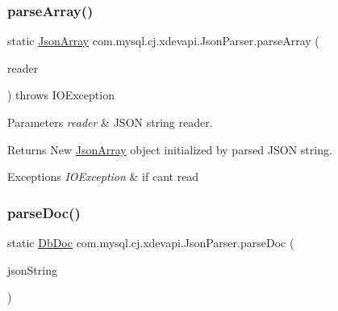 \subsubsection{\texorpdfstring{parse\+Array()}{parseArray()}}
{\footnotesize\ttfamily static \mbox{\hyperlink{classcom_1_1mysql_1_1cj_1_1xdevapi_1_1_json_array}{Json\+Array}} com.\+mysql.\+cj.\+xdevapi.\+Json\+Parser.\+parse\+Array (\begin{DoxyParamCaption}\item[{String\+Reader}]{reader }\end{DoxyParamCaption}) throws I\+O\+Exception\hspace{0.3cm}{\ttfamily [static]}}


\begin{DoxyParams}{Parameters}
{\em reader} & J\+S\+ON string reader. \\
\hline
\end{DoxyParams}
\begin{DoxyReturn}{Returns}
New \mbox{\hyperlink{classcom_1_1mysql_1_1cj_1_1xdevapi_1_1_json_array}{Json\+Array}} object initialized by parsed J\+S\+ON string. 
\end{DoxyReturn}

\begin{DoxyExceptions}{Exceptions}
{\em I\+O\+Exception} & if can\textquotesingle{}t read \\
\hline
\end{DoxyExceptions}
\mbox{\label{classcom_1_1mysql_1_1cj_1_1xdevapi_1_1_json_parser_ad779f7c1563d2bcca7481d3655519501}} 
\subsubsection{\texorpdfstring{parse\+Doc()}{parseDoc()}\hspace{0.1cm}{\footnotesize\ttfamily [1/2]}}
{\footnotesize\ttfamily static \mbox{\hyperlink{interfacecom_1_1mysql_1_1cj_1_1xdevapi_1_1_db_doc}{Db\+Doc}} com.\+mysql.\+cj.\+xdevapi.\+Json\+Parser.\+parse\+Doc (\begin{DoxyParamCaption}\item[{String}]{json\+String }\end{DoxyParamCaption})\hspace{0.3cm}{\ttfamily [static]}}

